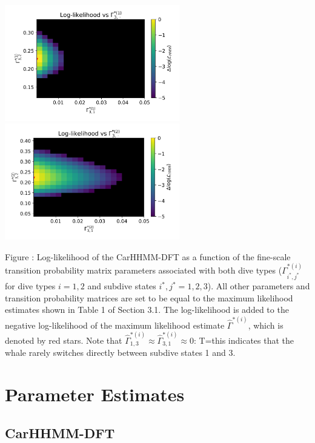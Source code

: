 \documentclass{article}
\begin{document}
\begin{center}
        \includegraphics[width=3in]{../Plots/2019/20190902-182840-CATs_OB_1_0_267_CarHHMM2_fine-gamma-likelihood-0-row_2.png}
        \includegraphics[width=3in]{../Plots/2019/20190902-182840-CATs_OB_1_0_267_CarHHMM2_fine-gamma-likelihood-1-row_2.png}
        \end{center}
        
        \noindent Figure : Log-likelihood of the CarHHMM-DFT as a function of the fine-scale transition probability matrix parameters associated with both dive types ($\Gamma^{*(i)}_{i^*,j^*}$ for dive types $i = 1,2$ and subdive states $i^*,j^* = 1,2,3$). All other parameters and transition probability matrices are set to be equal to the maximum likelihood estimates shown in Table 1 of Section 3.1. The log-likelihood is added to the negative log-likelihood of the maximum likelihood estimate $\hat \Gamma^{*(i)}$, which is denoted by red stars. Note that $\hat \Gamma^{*(i)}_{1,3} \approx \hat \Gamma^{*(i)}_{3,1} \approx 0$: T=this indicates that the whale rarely switches directly between subdive states 1 and 3.
        \addtocounter{fignum}{1}
        
        \newpage    
    
    \section{Parameter Estimates}

        \subsection{CarHHMM-DFT}
        
\end{document}
